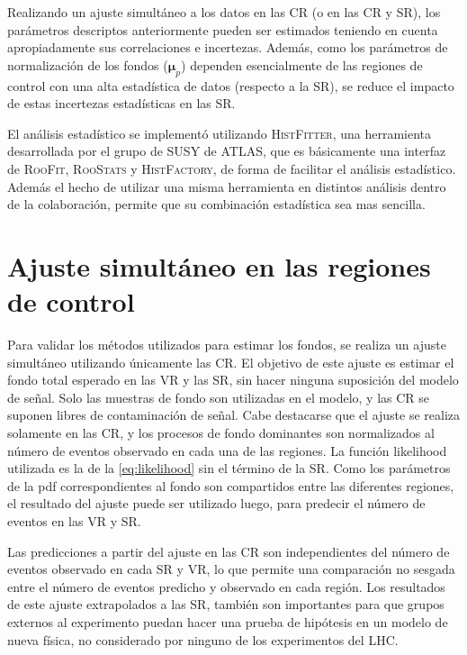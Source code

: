 Realizando un ajuste simultáneo a los datos en las CR (o en las CR y SR), los
parámetros descriptos anteriormente pueden ser estimados teniendo en cuenta
apropiadamente sus correlaciones e incertezas. Además, como los parámetros
de normalización de los fondos ($\bm{\mu}_p$) dependen esencialmente de las
regiones de control con una alta estadística de datos (respecto a la SR),
se reduce el impacto de estas incertezas estadísticas en las SR.


El análisis estadístico se implementó utilizando \textsc{HistFitter}\cite{HistFitter}, una herramienta
desarrollada por el grupo de SUSY de ATLAS, que es básicamente una interfaz de
\textsc{RooFit}, \textsc{RooStats}\cite{Moneta:2010pm} y
\textsc{HistFactory}\cite{Cranmer:1456844}, de forma de facilitar el análisis
estadístico. Además el hecho de utilizar una misma herramienta en distintos
análisis dentro de la colaboración, permite que su combinación estadística sea mas
sencilla.





\section{Ajuste simultáneo en las regiones de control}
\label{sec:bkgonlyfit}

Para validar  los métodos utilizados para estimar los
fondos, se realiza un ajuste simultáneo utilizando únicamente las CR.
El objetivo de este ajuste es estimar el fondo total esperado en las VR y las
SR, sin hacer ninguna suposición del modelo de señal. Solo las muestras de fondo
son utilizadas en el modelo, y las CR se suponen libres de contaminación de
señal. Cabe destacarse que el ajuste se realiza solamente en las CR, y los procesos de fondo dominantes
son normalizados al número de eventos observado en cada una de las regiones. La
función likelihood utilizada es la de la \cref{eq:likelihood} sin el término de la
SR. Como los parámetros de la pdf correspondientes al fondo son compartidos
entre las diferentes regiones, el resultado del ajuste puede ser utilizado luego, para
predecir el número de eventos en las VR y SR.

Las predicciones a partir del ajuste en las CR son independientes del número de
eventos observado en cada SR y VR, lo que permite una comparación no sesgada
entre el número de eventos predicho y observado en cada región. Los resultados
de este ajuste extrapolados a las SR, también son importantes para que grupos
externos al experimento puedan hacer una prueba de hipótesis en un modelo de
nueva física, no considerado por ninguno de los experimentos del LHC.

